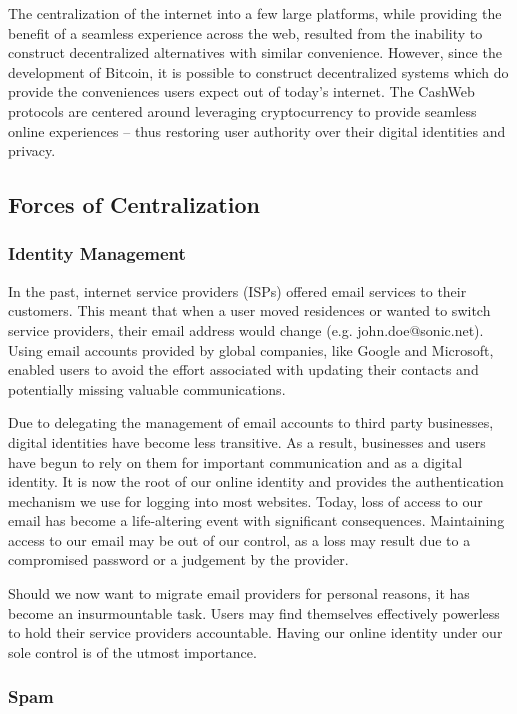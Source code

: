 \documentclass{article}
\begin{document}
The centralization of the internet into a few large platforms, while providing the benefit of a seamless experience across the web, resulted from the inability to construct decentralized alternatives with similar convenience. However, since the development of Bitcoin\supercite{nakamoto2008bpp}, it is possible to construct decentralized systems which do provide the conveniences users expect out of today's internet. The CashWeb protocols are centered around leveraging cryptocurrency to provide seamless online experiences -- thus restoring user authority over their digital identities and privacy. 

\subsection{Forces of Centralization}

\subsubsection{Identity Management}

In the past, internet service providers (ISPs) offered email services to their customers. This meant that when a user moved residences or wanted to switch service providers, their email address would change (e.g. john.doe@sonic.net). Using email accounts provided by global companies, like Google and Microsoft, enabled users to avoid the effort associated with updating their contacts and potentially missing valuable communications.

Due to delegating the management of email accounts to third party businesses, digital identities have become less transitive. As a result, businesses and users have begun to rely on them for important communication and as a digital identity. It is now the root of our online identity and provides the authentication mechanism we use for logging into most websites. Today, loss of access to our email has become a life-altering event with significant consequences. Maintaining access to our email may be out of our control, as a loss may result due to a compromised password or a judgement by the provider. 

Should we now want to migrate email providers for personal reasons, it has become an insurmountable task. Users may find themselves effectively powerless to hold their service providers accountable. Having our online identity under our sole control is of the utmost importance.

\subsubsection{Spam}
\end{document}
